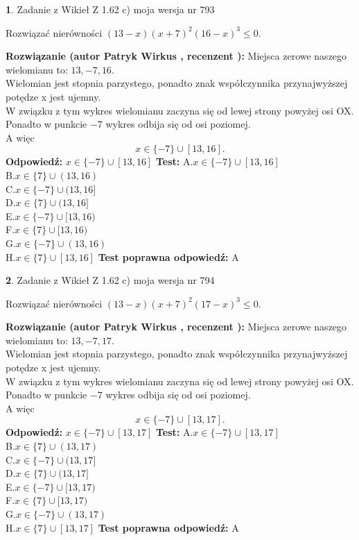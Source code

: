 \documentclass[12pt, a4paper]{article}
\theoremstyle{definition} %
\newtheorem{zad}{}
\newcommand{\zadStart}[1]{\begin{zad}#1\newline}
\newcommand{\zadStop}{\end{zad}}
\newcommand{\rozwStart}[2]{\noindent \textbf{Rozwiązanie (autor #1 , recenzent #2): }\newline}
\newcommand{\rozwStop}{\newline}
\newcommand{\odpStart}{\noindent \textbf{Odpowiedź:}\newline}
\newcommand{\odpStop}{\newline}
\newcommand{\testStart}{\noindent \textbf{Test:}\newline}
\newcommand{\testStop}{\newline}
\newcommand{\kluczStart}{\noindent \textbf{Test poprawna odpowiedź:}\newline}
\newcommand{\kluczStop}{\newline}
\begin{document}
\zadStart{Zadanie z Wikieł Z 1.62 c) moja wersja nr 793}

Rozwiązać nierówności $(13-x)(x+7)^{2}(16-x)^{3}\le0$.
\zadStop
\rozwStart{Patryk Wirkus}{}
Miejsca zerowe naszego wielomianu to: $13, -7, 16$.\\
Wielomian jest stopnia parzystego, ponadto znak współczynnika przy\linebreak najwyższej potędze x jest ujemny.\\ W związku z tym wykres wielomianu zaczyna się od lewej strony powyżej osi OX.\\
Ponadto w punkcie $-7$ wykres odbija się od osi poziomej.\\
A więc $$x \in \{-7\} \cup [13,16].$$
\rozwStop
\odpStart
$x \in \{-7\} \cup [13,16]$
\odpStop
\testStart
A.$x \in \{-7\} \cup [13,16]$\\
B.$x \in \{7\} \cup (13,16)$\\
C.$x \in \{-7\} \cup (13,16]$\\
D.$x \in \{7\} \cup (13,16]$\\
E.$x \in \{-7\} \cup [13,16)$\\
F.$x \in \{7\} \cup [13,16)$\\
G.$x \in \{-7\} \cup (13,16)$\\
H.$x \in \{7\} \cup [13,16]$
\testStop
\kluczStart
A
\kluczStop



\zadStart{Zadanie z Wikieł Z 1.62 c) moja wersja nr 794}

Rozwiązać nierówności $(13-x)(x+7)^{2}(17-x)^{3}\le0$.
\zadStop
\rozwStart{Patryk Wirkus}{}
Miejsca zerowe naszego wielomianu to: $13, -7, 17$.\\
Wielomian jest stopnia parzystego, ponadto znak współczynnika przy\linebreak najwyższej potędze x jest ujemny.\\ W związku z tym wykres wielomianu zaczyna się od lewej strony powyżej osi OX.\\
Ponadto w punkcie $-7$ wykres odbija się od osi poziomej.\\
A więc $$x \in \{-7\} \cup [13,17].$$
\rozwStop
\odpStart
$x \in \{-7\} \cup [13,17]$
\odpStop
\testStart
A.$x \in \{-7\} \cup [13,17]$\\
B.$x \in \{7\} \cup (13,17)$\\
C.$x \in \{-7\} \cup (13,17]$\\
D.$x \in \{7\} \cup (13,17]$\\
E.$x \in \{-7\} \cup [13,17)$\\
F.$x \in \{7\} \cup [13,17)$\\
G.$x \in \{-7\} \cup (13,17)$\\
H.$x \in \{7\} \cup [13,17]$
\testStop
\kluczStart
A
\kluczStop
\end{document}

